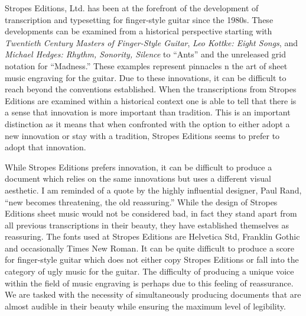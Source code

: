 \documentclass[unicode,hyperfootnotes=false,xetex,colorlinks=true,nofonts,nobib]{tufte-handout}
\newcommand{\textls}[2][5]{%
    \begingroup\addfontfeatures{LetterSpace=#1}#2\endgroup
  }
\renewcommand{\smallcapsspacing}[1]{\textls[10]{#1}}
\renewcommand{\textsc}[1]{\smallcapsspacing{\textsmallcaps{#1}}}
\begin{document}
Stropes Editions, Ltd. has been at the forefront of the development of transcription and typesetting for finger-style guitar since the 1980s. These developments can be examined from a historical perspective starting with \emph{Twentieth Century Masters of Finger-Style Guitar}, \emph{Leo Kottke: Eight Songs}, and \emph{Michael Hedges: Rhythm, Sonority, Silence} to ``Ants'' and the unreleased grid notation for ``Madness.'' These examples represent pinnacles n the art of sheet music engraving for the guitar.  Due to these innovations, it can be difficult to reach beyond the conventions established. When the transcriptions from Stropes Editions are examined within a historical context one is able to tell that there is a sense that innovation is more important than tradition. This is an important distinction as it means that when confronted with the option to either adopt a new innovation or stay with a tradition, Stropes Editions seems to prefer to adopt that innovation. 

  While Stropes Editions prefers innovation, it can be difficult to produce a document which relies on the same innovations but uses a different visual aesthetic. I am reminded of a quote by the highly influential designer, Paul Rand, ``new becomes threatening, the old reassuring.'' While the design of Stropes Editions sheet music would not be considered bad, in fact they stand apart from all previous transcriptions in their beauty, they have established themselves as reassuring. The fonts used at Stropes Editions are Helvetica \textsc{lt} Std, \textsc{itc} Franklin Gothic and occasionally Times New Roman. It can be quite difficult to produce a score for finger-style guitar which does not either copy Stropes Editions or fall into the category of ugly music for the guitar. The difficulty of producing a unique voice within the field of music engraving is perhaps due to this feeling of reassurance. We are tasked with the necessity of simultaneously producing documents that are almost audible in their beauty while ensuring the maximum level of legibility. 
  
\end{document}
